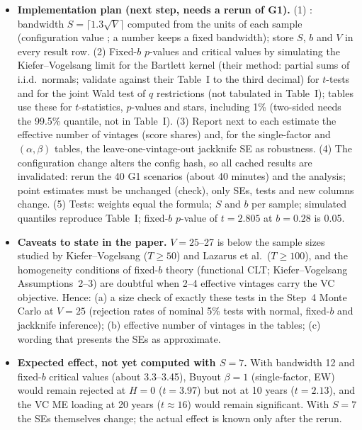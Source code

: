 \documentclass[11pt]{article}
\newcommand{\code}[1]{\texttt{\detokenize{#1}}}
\newcommand{\file}[1]{\path{#1}}
\begin{document}
\begin{itemize}
\item \textbf{Implementation plan (next step, needs a rerun of G1).} (1) \file{helper/inference.R}: bandwidth $S=\lceil1.3\sqrt V\rceil$ computed from the units of each sample (configuration value \code{kernel_bandwidth: "llsw"}; a number keeps a fixed bandwidth); store $S$, $b$ and $V$ in every result row. (2) Fixed-$b$ $p$-values and critical values by simulating the Kiefer--Vogelsang limit for the Bartlett kernel (their method: partial sums of i.i.d.\ normals; validate against their Table~I to the third decimal) for $t$-tests and for the joint Wald test of $q$ restrictions (not tabulated in Table~I); tables use these for $t$-statistics, $p$-values and stars, including 1\% (two-sided needs the 99.5\% quantile, not in Table~I). (3) Report next to each estimate the effective number of vintages (score shares) and, for the single-factor and $(\alpha,\beta)$ tables, the leave-one-vintage-out jackknife SE as robustness. (4) The configuration change alters the config hash, so all cached results are invalidated: rerun the 40 G1 scenarios (about 40 minutes) and the analysis; point estimates must be unchanged (check), only SEs, tests and new columns change. (5) Tests: weights equal the formula; $S$ and $b$ per sample; simulated quantiles reproduce Table~I; fixed-$b$ $p$-value of $t=2.805$ at $b=0.28$ is 0.05.
\item \textbf{Caveats to state in the paper.} $V=25$--27 is below the sample sizes studied by Kiefer--Vogelsang ($T\ge50$) and Lazarus et al.\ ($T\ge100$), and the homogeneity conditions of fixed-$b$ theory (functional CLT; Kiefer--Vogelsang Assumptions~2--3) are doubtful when 2--4 effective vintages carry the VC objective. Hence: (a) a size check of exactly these tests in the Step~4 Monte Carlo at $V=25$ (rejection rates of nominal 5\% tests with normal, fixed-$b$ and jackknife inference); (b) effective number of vintages in the tables; (c) wording that presents the SEs as approximate.
\item \textbf{Expected effect, not yet computed with $S=7$.} With bandwidth 12 and fixed-$b$ critical values (about 3.3--3.45), Buyout $\beta=1$ (single-factor, EW) would remain rejected at $H=0$ ($t=3.97$) but not at 10 years ($t=2.13$), and the VC ME loading at 20 years ($t\approx16$) would remain significant. With $S=7$ the SEs themselves change; the actual effect is known only after the rerun.
\end{itemize}
\end{document}
